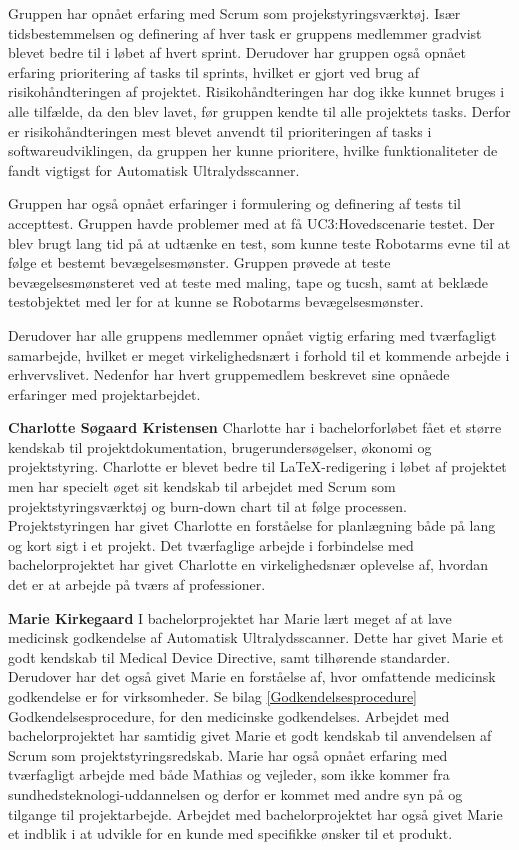 Gruppen har opnået erfaring med Scrum som projekstyringsværktøj. Især tidsbestemmelsen og definering af hver task er gruppens medlemmer gradvist blevet bedre til i løbet af hvert sprint. Derudover har gruppen også opnået erfaring prioritering af tasks til sprints, hvilket er gjort ved brug af risikohåndteringen af projektet. Risikohåndteringen har dog ikke kunnet bruges i alle tilfælde, da den blev lavet, før gruppen kendte til alle projektets tasks. Derfor er risikohåndteringen mest blevet anvendt til prioriteringen af tasks i softwareudviklingen, da gruppen her kunne prioritere, hvilke funktionaliteter de fandt vigtigst for Automatisk Ultralydsscanner. 

Gruppen har også opnået erfaringer i formulering og definering af tests til accepttest. Gruppen havde problemer med at få UC3:Hovedscenarie testet. Der blev brugt lang tid på at udtænke en test, som kunne teste Robotarms evne til at følge et bestemt bevægelsesmønster. Gruppen prøvede at teste bevægelsesmønsteret ved at teste med maling, tape og tucsh, samt at beklæde testobjektet med ler for at kunne se Robotarms bevægelsesmønster. 

Derudover har alle gruppens medlemmer opnået vigtig erfaring med tværfagligt samarbejde, hvilket er meget virkelighedsnært i forhold til et kommende arbejde i erhvervslivet. 
Nedenfor har hvert gruppemedlem beskrevet sine opnåede erfaringer med projektarbejdet. 

\textbf{Charlotte Søgaard Kristensen}
Charlotte har i bachelorforløbet fået et større kendskab til projektdokumentation, brugerundersøgelser, økonomi og projektstyring. Charlotte er blevet bedre til LaTeX-redigering i løbet af projektet men har specielt øget sit kendskab til arbejdet med Scrum som projektstyringsværktøj og burn-down chart til at følge processen. Projektstyringen har givet Charlotte en forståelse for planlægning både på lang og kort sigt i et projekt. Det tværfaglige arbejde i forbindelse med bachelorprojektet har givet Charlotte en virkelighedsnær oplevelse af, hvordan det er at arbejde på tværs af professioner. 

\textbf{Marie Kirkegaard}
I bachelorprojektet har Marie lært meget af at lave medicinsk godkendelse af Automatisk Ultralydsscanner. Dette har givet Marie et godt kendskab til Medical Device Directive, samt tilhørende standarder. Derudover har det også givet Marie en forståelse af, hvor omfattende medicinsk godkendelse er for virksomheder. Se bilag \ref{Godkendelsesprocedure} Godkendelsesprocedure, for den medicinske godkendelses. Arbejdet med bachelorprojektet har samtidig givet Marie et godt kendskab til anvendelsen af Scrum som projektstyringsredskab. Marie har også opnået erfaring med tværfagligt arbejde med både Mathias og vejleder, som ikke kommer fra sundhedsteknologi-uddannelsen og derfor er kommet med andre syn på og tilgange til projektarbejde. Arbejdet med bachelorprojektet har også givet Marie et indblik i at udvikle for en kunde med specifikke ønsker til et produkt. 

